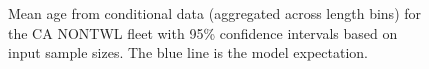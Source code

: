 \documentclass[
]{scrartcl}
\begin{document}
\begin{figure}


\caption{\label{fig-mean-age-2}Mean age from conditional data
(aggregated across length bins) for the CA NONTWL fleet with 95\%
confidence intervals based on input sample sizes. The blue line is the
model expectation.}

\end{figure}%
\end{document}
